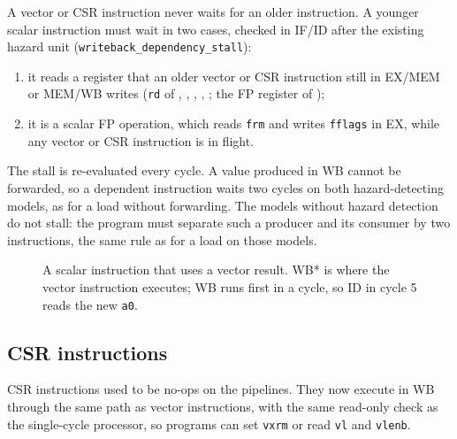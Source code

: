 \documentclass[11pt]{article}
\begin{document}
A vector or CSR instruction never waits for an older instruction. A younger scalar instruction
must wait in two cases, checked in IF/ID after the existing hazard unit
(\texttt{writeback\_dependency\_stall}):

\begin{enumerate}
\item it reads a register that an older vector or CSR instruction still in EX/MEM or MEM/WB
      writes (\texttt{rd} of , , , ,
      ; the FP register of );
\item it is a scalar FP operation, which reads \texttt{frm} and writes \texttt{fflags} in EX,
      while any vector or CSR instruction is in flight.
\end{enumerate}

The stall is re-evaluated every cycle. A value produced in WB cannot be forwarded, so a dependent
instruction waits two cycles on both hazard-detecting models, as for a load without forwarding.
The models without hazard detection do not stall: the program must separate such a producer and
its consumer by two instructions, the same rule as for a load on those models.

\begin{figure}[H]
\centering
{}
\caption{A scalar instruction that uses a vector result. WB* is where the vector instruction
executes; WB runs first in a cycle, so ID in cycle 5 reads the new \texttt{a0}.}\label{fig:stall}
\end{figure}

\subsection{CSR instructions}
CSR instructions used to be no-ops on the pipelines. They now execute in WB through the same path
as vector instructions, with the same read-only check as the single-cycle processor, so programs
can set \texttt{vxrm} or read \texttt{vl} and \texttt{vlenb}.
\end{document}
